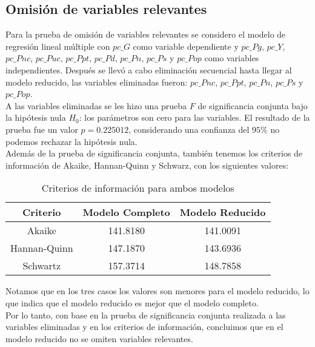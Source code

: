 \documentclass[12pt]{article}
\begin{document}


\subsection*{Omisión de variables relevantes}

Para la prueba de omisión de variables relevantes se considero el modelo de 
regresión lineal múltiple con $pc\_G$ como variable dependiente 
y $pc\_Pg$, $pc\_Y$, $pc\_Pnc$, $pc\_Puc$, $pc\_Ppt$, $pc\_Pd$, $pc\_Pn$,
 $pc\_Ps$ y $pc\_Pop$ como variables independientes. Después se llevó a cabo
 eliminación secuencial hasta llegar al modelo reducido, las variables 
 eliminadas fueron: $pc\_Pnc$, $pc\_Ppt$, $pc\_Pn$, $pc\_Ps$ y $pc\_Pop$.\\
 A las variables eliminadas se les hizo una prueba $F$ de significancia 
 conjunta bajo la hipótesis nula $H_0$: los parámetros son cero para las
 variables. El resultado de la prueba fue un valor $p=0.225012$, considerando
 una confianza del $95\%$ no podemos rechazar la hipótesis nula.\\
 Además de la prueba de significancia conjunta, también tenemos los criterios
 de información de Akaike, Hannan-Quinn y Schwarz, con los siguientes valores:

 \begin{table}[h]
    \centering
    \begin{tabular}{|c|c|c|}
        \hline
        \hline
        \textbf{Criterio} & \textbf{Modelo Completo} & \textbf{Modelo Reducido} \\
        \hline
        Akaike & 141.8180 & 141.0091 \\
        Hannan-Quinn & 147.1870 & 143.6936 \\
        Schwartz & 157.3714 & 148.7858 \\
        \hline
        \hline
    \end{tabular}
    \caption{Criterios de información para ambos modelos}
 \end{table}

Notamos que en los tres casos los valores son menores para el modelo reducido,
lo que indica que el modelo reducido es mejor que el modelo completo.\\
Por lo tanto, con base en la prueba de significancia conjunta realizada a
las variables eliminadas y en los criterios de información, concluimos
que en el modelo reducido no se omiten variables relevantes.
\end{document}
